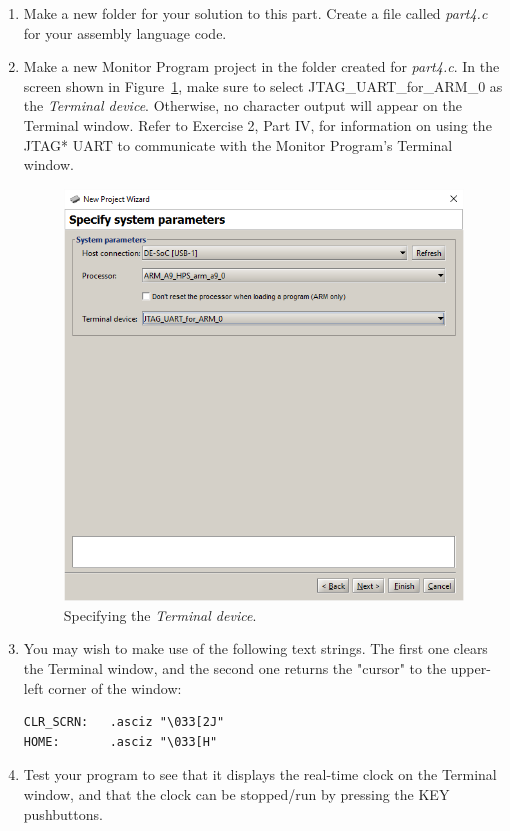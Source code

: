 \documentclass[epsfig,10pt,fullpage]{article}
\newcommand{\CommonDocsPath}{../../../../common/docs}
\begin{document}
\begin{enumerate}
\item
Make a new folder for your solution to this part. Create a file called {\it part4.c} for 
your assembly language code. 
\item
Make a new Monitor Program project in the folder created for {\it part4.c}. In the screen 
shown in Figure~\ref{fig:terminal}, make sure to select {\sf JTAG\_UART\_for\_ARM\_0} as 
the {\it Terminal device}. Otherwise, no character output will appear on the Terminal window.
Refer to Exercise 2, Part IV, for information on using the JTAG* UART to communicate with 
the Monitor Program's Terminal window.  

\begin{figure}[htb]
	\begin{center}
	\includegraphics[scale=0.58]{figures/terminal.png}
	\end{center}
	\vspace{-0.25cm}\caption{Specifying the {\it Terminal device}.}
\label{fig:terminal}
\end{figure}

\item
You may wish to make use of the following text 
strings. The first one clears the Terminal window, and the second one returns the "cursor" to the 
upper-left corner of the window:
~\\
\begin{minipage}[t]{12.5 cm}
\begin{lstlisting}[style=defaultArmStyle]
CLR_SCRN: 	.asciz "\033[2J"
HOME: 		.asciz "\033[H"
\end{lstlisting}
\end{minipage}
\item
Test your program to see that it displays the real-time clock on the Terminal window, and that the
clock can be stopped/run by pressing the KEY pushbuttons.
\end{enumerate}



\end{document}
